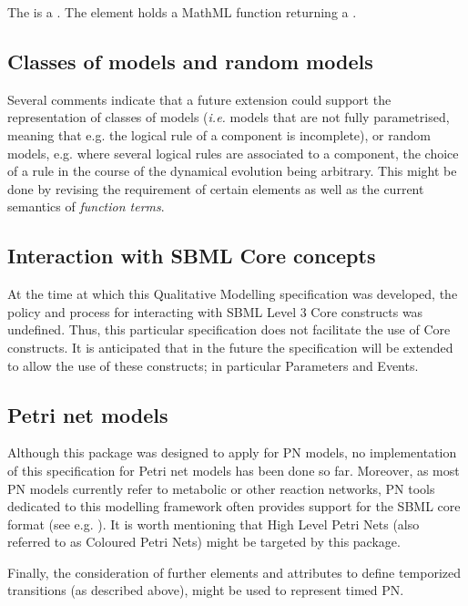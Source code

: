 The  is a . The element  holds a MathML function returning a . 


\subsection{Classes of models and random models}
Several comments indicate that a future extension could support the representation of classes of models ({\it i.e.} models that are not fully parametrised, meaning that e.g. the logical rule of a component is incomplete), or random models, e.g. where several logical rules are associated to a component, the choice of a rule in the course of the dynamical evolution being arbitrary.
This might be done by revising the requirement of certain elements as well as the current semantics of {\em function terms}.

\subsection{Interaction with SBML Core concepts}
At the time at which this Qualitative Modelling specification was developed, the policy and process for interacting with SBML Level 3 Core constructs was undefined. Thus, this particular specification does not facilitate the use of Core constructs. It is anticipated that in the future the specification will be extended to allow the use of these constructs; in particular Parameters and Events.

\subsection{Petri net models}

Although this package was designed to apply for PN models, no implementation of this specification for Petri net models has been done so far. Moreover, as most PN models currently refer to metabolic or other reaction networks, PN tools dedicated to this modelling framework often provides support for the SBML core format (see e.g. \cite{snoopy10}). It is worth mentioning that High Level Petri Nets (also referred to as Coloured Petri Nets) might be targeted by this package.

Finally, the consideration of further elements and attributes to define temporized transitions (as described above), might be used to represent timed PN.
